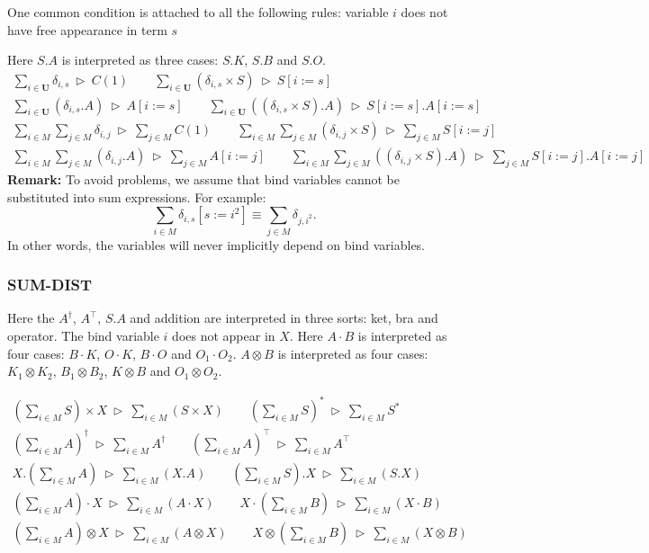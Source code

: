\documentclass[manuscript, review, timestamp]{acmart}
\newcommand*{\reduce}{\ \triangleright\ }
\begin{document}
One common condition is attached to all the following rules: variable $i$ does not have free appearance in term $s$

Here $S.A$ is interpreted as three cases: $S.K$, $S.B$ and $S.O$.
\begin{gather*}
  \sum_{i \in \mathbf{U}} \delta_{i, s} \reduce C(1)
  \qquad
  \sum_{i \in \mathbf{U}} (\delta_{i, s} \times S) \reduce S[i:=s] \\
  \sum_{i \in \mathbf{U}} (\delta_{i, s}.A) \reduce A[i:=s]
  \qquad
  \sum_{i \in \mathbf{U}} ((\delta_{i, s} \times S).A) \reduce S[i:=s].A[i:=s]
\end{gather*}
\begin{gather*}
  \sum_{i \in M} \sum_{j \in M} \delta_{i, j} \reduce \sum_{j \in M} C(1)
  \qquad
  \sum_{i \in M} \sum_{j \in M} (\delta_{i, j} \times S) \reduce \sum_{j \in M} S[i:=j] \\
  \sum_{i \in M} \sum_{j \in M} (\delta_{i, j}.A) \reduce \sum_{j \in M} A[i:=j]
  \qquad
  \sum_{i \in M} \sum_{j \in M} ((\delta_{i, j} \times S).A) \reduce \sum_{j \in M} S[i:=j].A[i:=j]
\end{gather*}
\textbf{Remark:} To avoid problems, we assume that bind variables cannot be substituted into sum expressions. For example:
$$
\sum_{i \in M} \delta_{i, s}[s:=i^2] \equiv \sum_{j \in M} \delta_{j, i^2}.
$$
In other words, the variables will never implicitly depend on bind variables.

\subsubsection*{\textsf{SUM-DIST}}

Here the $A^\dagger$, $A^\top$, $S.A$ and addition are interpreted in three sorts: ket, bra and operator.
The bind variable $i$ does not appear in $X$.
Here $A \cdot B$ is interpreted as four cases: $B \cdot K$, $O \cdot K$, $B \cdot O$ and $O_1 \cdot O_2$. $A \otimes B$ is interpreted as four cases: $K_1 \otimes K_2$, $B_1 \otimes B_2$, $K \otimes B$ and $O_1 \otimes O_2$.

\begin{gather*}
  (\sum_{i \in M} S) \times X \reduce \sum_{i \in M} (S \times X)
  \qquad
  (\sum_{i \in M} S)^* \reduce \sum_{i \in M} S^* \\
  (\sum_{i \in M} A)^\dagger \reduce \sum_{i \in M} A^\dagger
  \qquad
  (\sum_{i \in M} A)^\top \reduce \sum_{i \in M} A^\top \\
  X.(\sum_{i \in M} A) \reduce \sum_{i \in M} (X.A)
  \qquad
  (\sum_{i \in M} S). X \reduce \sum_{i \in M} (S.X) \\
  (\sum_{i \in M} A) \cdot X \reduce \sum_{i \in M} (A \cdot X) 
  \qquad
  X \cdot (\sum_{i \in M} B) \reduce \sum_{i \in M} (X \cdot B) \\
  (\sum_{i \in M} A) \otimes X \reduce \sum_{i \in M} (A \otimes X) 
  \qquad
  X \otimes (\sum_{i \in M} B) \reduce \sum_{i \in M} (X \otimes B)
\end{gather*}
\end{document}
